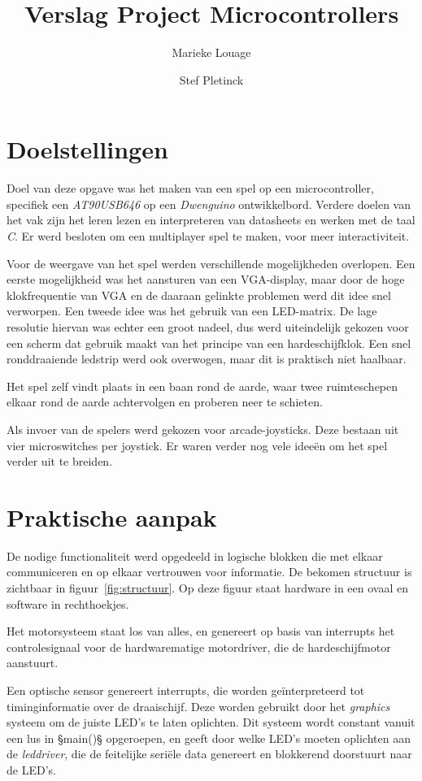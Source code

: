 \documentclass[12pt]{ugentreport}
\title{Verslag Project Microcontrollers}
\author{Marieke Louage\and Stef Pletinck}
\begin{document}
\maketitle

\tableofcontents
\listoffigures
\listoftodos
\newpage

\section{Doelstellingen}
Doel van deze opgave was het maken van een spel op een microcontroller,
specifiek een \emph{AT90USB646} op een \emph{Dwenguino} ontwikkelbord.
Verdere doelen van het vak zijn het leren lezen en interpreteren van datasheets
en werken met de taal \emph{C}.
Er werd besloten om een multiplayer spel te maken,
voor meer interactiviteit.

Voor de weergave van het spel werden verschillende mogelijkheden overlopen.
Een eerste mogelijkheid was het aansturen van een VGA-display,
maar door de hoge klokfrequentie van VGA en de daaraan gelinkte problemen
werd dit idee snel verworpen.
Een tweede idee was het gebruik van een LED-matrix.
De lage resolutie hiervan was echter een groot nadeel,
dus werd uiteindelijk gekozen voor een scherm dat gebruik maakt
van het principe van een hardeschijfklok. Een snel ronddraaiende ledstrip werd
ook overwogen, maar dit is praktisch niet haalbaar.

Het spel zelf vindt plaats in een baan rond de aarde, waar twee ruimteschepen
elkaar rond de aarde achtervolgen en proberen neer te schieten.

Als invoer van de spelers werd gekozen voor arcade-joysticks.
Deze bestaan uit vier microswitches per joystick.
Er waren verder nog vele ideeën om het spel verder uit te breiden.

\section{Praktische aanpak}
De nodige functionaliteit werd opgedeeld in logische blokken die met elkaar
communiceren en op elkaar vertrouwen voor informatie. De bekomen structuur is
zichtbaar in figuur~\ref{fig:structuur}.
Op deze figuur staat hardware in een ovaal en software in rechthoekjes.

Het motorsysteem staat los van alles, en genereert op basis van interrupts het
controlesignaal voor de hardwarematige motordriver, die de hardeschijfmotor
aanstuurt.

Een optische sensor genereert interrupts, die worden geïnterpreteerd tot
timinginformatie over de draaischijf. Deze worden gebruikt door het
\emph{graphics} systeem om de juiste LED's te laten oplichten. Dit systeem wordt
constant vanuit een lus in §main()§ opgeroepen, en geeft door welke LED's moeten
oplichten aan de \emph{leddriver}, die de feitelijke seriële data genereert en
blokkerend doorstuurt naar de LED's.
\end{document}
